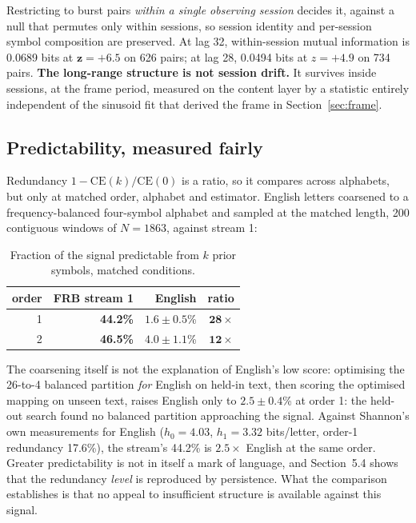 \documentclass[11pt,a4paper]{article}
\newcommand{\bnum}[1]{\textbf{#1}}
\begin{document}
Restricting to burst pairs \emph{within a single observing session} decides it, against
a null that permutes only within sessions, so session identity and per-session symbol
composition are preserved. At lag 32, within-session mutual information is 0.0689 bits
at $\mathbf{z = +6.5}$ on 626 pairs; at lag 28, 0.0494 bits at $z = +4.9$ on 734 pairs.
\textbf{The long-range structure is not session drift.} It survives inside sessions, at
the frame period, measured on the content layer by a statistic entirely independent of
the sinusoid fit that derived the frame in Section~\ref{sec:frame}.

\subsection{Predictability, measured fairly}

Redundancy $1 - \mathrm{CE}(k)/\mathrm{CE}(0)$ is a ratio, so it compares across
alphabets, but only at matched order, alphabet and estimator. English letters coarsened
to a frequency-balanced four-symbol alphabet and sampled at the matched length, 200
contiguous windows of $N = 1863$, against stream 1:

\begin{table}[htbp]
\centering
\caption{Fraction of the signal predictable from $k$ prior symbols, matched conditions.}
\label{tab:redundancy}
\begin{tabular}{rrrr}
\toprule
order & FRB stream 1 & English & ratio \\
\midrule
1 & \bnum{44.2\%} & $1.6 \pm 0.5$\% & $\mathbf{28\times}$ \\
2 & \bnum{46.5\%} & $4.0 \pm 1.1$\% & $\mathbf{12\times}$ \\
\bottomrule
\end{tabular}
\end{table}

The coarsening itself is not the explanation of English's low score: optimising the
26-to-4 balanced partition \emph{for} English on held-in text, then scoring the
optimised mapping on unseen text, raises English only to $2.5 \pm 0.4$\% at order 1:
the held-out search found no balanced partition approaching the signal. Against Shannon's own measurements for
English \cite{shannon1951} ($h_0 = 4.03$, $h_1 = 3.32$ bits/letter, order-1 redundancy
17.6\%), the stream's 44.2\% is $2.5\times$ English at the same order. Greater predictability is not in itself a mark of
language, and Section~5.4 shows that the redundancy \emph{level} is reproduced by
persistence. What the comparison establishes is that no appeal to insufficient structure
is available against this signal.
\end{document}
